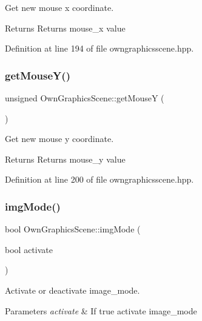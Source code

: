 Get new mouse x coordinate. 

\begin{DoxyReturn}{Returns}
Returns mouse\+\_\+x value 
\end{DoxyReturn}


Definition at line 194 of file owngraphicsscene.\+hpp.

\mbox{\label{classOwnGraphicsScene_a3fd2942e9930fc2dda41844622dc8a35}} 
\subsubsection{\texorpdfstring{get\+Mouse\+Y()}{getMouseY()}}
{\footnotesize\ttfamily unsigned Own\+Graphics\+Scene\+::get\+MouseY (\begin{DoxyParamCaption}{ }\end{DoxyParamCaption})\hspace{0.3cm}{\ttfamily [inline]}}



Get new mouse y coordinate. 

\begin{DoxyReturn}{Returns}
Returns mouse\+\_\+y value 
\end{DoxyReturn}


Definition at line 200 of file owngraphicsscene.\+hpp.

\mbox{\label{classOwnGraphicsScene_acc6e7978a3f10889e439ceabd155a341}} 
\subsubsection{\texorpdfstring{img\+Mode()}{imgMode()}}
{\footnotesize\ttfamily bool Own\+Graphics\+Scene\+::img\+Mode (\begin{DoxyParamCaption}\item[{bool}]{activate }\end{DoxyParamCaption})}



Activate or deactivate image\+\_\+mode. 


\begin{DoxyParams}{Parameters}
{\em activate} & If true activate image\+\_\+mode \\
\hline
\end{DoxyParams}


